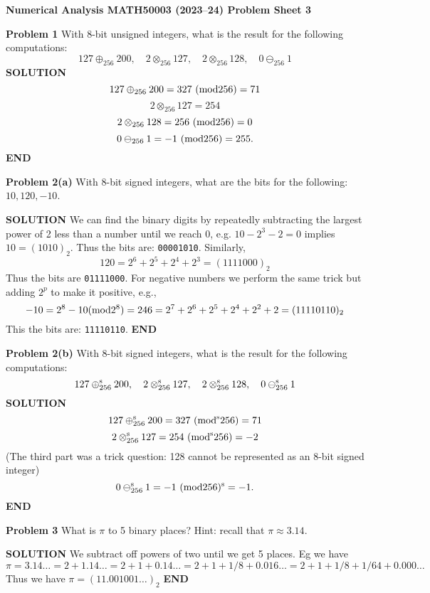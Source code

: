 \documentclass[12pt,a4paper]{article}
\def\endash{–}
\begin{document}
\textbf{Numerical Analysis MATH50003 (2023\ensuremath{\endash}24) Problem Sheet 3}

\textbf{Problem 1} With 8-bit unsigned integers, what is the result for the following computations:
\[
127 \ensuremath{\oplus}_{256} 200,\quad 2 \ensuremath{\otimes}_{256} 127,\quad 2 \ensuremath{\otimes}_{256} 128, \quad 0 \ensuremath{\ominus}_{256} 1
\]
\textbf{SOLUTION}
\[
127 \ensuremath{\oplus}_{256} 200 = 327\ ({\rm mod} 256) = 71
\]
\[
2 \ensuremath{\otimes}_{256} 127 = 254
\]
\[
2 \ensuremath{\otimes}_{256} 128 = 256 \ ({\rm mod} 256) = 0
\]
\[
0 \ensuremath{\ominus}_{256} 1 = -1  \ ({\rm mod} 256) = 255.
\]
\textbf{END}

\textbf{Problem 2(a)} With 8-bit signed integers, what are the bits for the following: $10, 120, -10$.

\textbf{SOLUTION} We can find the binary digits by repeatedly subtracting the largest power of 2 less than a number until we reach 0, e.g. $10 - 2^3 - 2 = 0$ implies $10 = (1010)_2$. Thus the bits are: \texttt{00001010}. Similarly,
\[
120 = 2^6 + 2^5 + 2^4 + 2^3 = (1111000)_2
\]
Thus the bits are \texttt{01111000}. For negative numbers we perform the same trick but adding $2^p$ to make it positive, e.g.,
\[
-10 = 2^8 - 10 ({\rm mod 2^8}) = 246 = 2^7 + 2^6 + 2^5 + 2^4 + 2^2 + 2 = (11110110)_2
\]
This the bits are: \texttt{11110110}. \textbf{END}

\textbf{Problem 2(b)} With 8-bit signed integers, what is the result for the following computations:
\[
127 \ensuremath{\oplus}_{256}^{\rm s} 200,\quad 2 \ensuremath{\otimes}_{256}^{\rm s} 127, \quad 2 \ensuremath{\otimes}_{256}^{\rm s} 128, \quad 0 \ensuremath{\ominus}_{256}^{\rm s} 1
\]
\textbf{SOLUTION}
\[
127 \ensuremath{\oplus}_{256}^{\rm s} 200 = 327\ ({\rm mod}^{\rm s} 256) = 71
\]
\[
2 \ensuremath{\otimes}_{256}^{\rm s} 127 = 254\ ({\rm mod}^{\rm s} 256) = -2
\]
(The third part was a trick question: 128 cannot be represented as an 8-bit signed integer)
\[
0 \ensuremath{\ominus}_{256}^{\rm s} 1 = -1  \ ({\rm mod} 256)^{\rm s} = -1.
\]
\textbf{END}

\textbf{Problem 3} What is $\ensuremath{\pi}$ to 5 binary places? Hint: recall that $\ensuremath{\pi} \ensuremath{\approx} 3.14$.

\textbf{SOLUTION} We subtract off powers of two until we get 5 places. Eg we have
\[
\ensuremath{\pi} = 3.14\ensuremath{\ldots} = 2 + 1.14\ensuremath{\ldots} = 2 + 1 + 0.14\ensuremath{\ldots} = 2 + 1 + 1/8 + 0.016\ensuremath{\ldots} = 2 + 1 + 1/8  + 1/64  + 0.000\ensuremath{\ldots}
\]
Thus we have $\ensuremath{\pi} = (11.001001\ensuremath{\ldots})_2$ \textbf{END}
\end{document}
